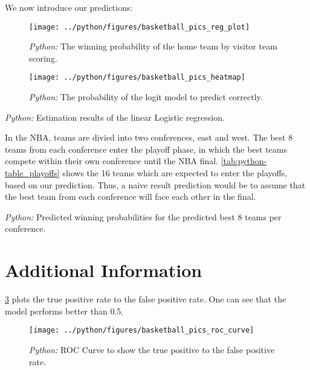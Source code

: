 \documentclass[11pt, a4paper, leqno]{article}
\begin{document}
We now introduce our predictions:


\begin{figure}[H]
\centering
\caption{\emph{Python:} The winning probability of the home team by visitor team scoring.}
\texttt{[image: ../python/figures/basketball\_pics\_reg\_plot]}
    \label{fig:python-reg_plot}

\end{figure}

\begin{figure}[H]

    \centering
    \caption{\emph{Python:} The probability of the logit model to predict correctly.}
    \texttt{[image: ../python/figures/basketball\_pics\_heatmap]}
    \label{fig:python-heatmap}

\end{figure}

\begin{table}[H]
    \caption{\label{tab:python-inference_model}\emph{Python:} Estimation results of the
    linear Logistic regression.}
    
\end{table}

In the NBA, teams are divied into two conferences, east and west. The best 8 teams from each conference enter the playoff phase, in which the best teams compete within their own conference until the NBA final.
\ref{tab:python-table_playoffs} shows the 16 teams which are expected to enter the playoffs, based on our prediction. Thus, a naive result prediction would be to assume that the best team from each conference will face each other in the final.

\begin{table}[H]
    \caption{\label{tab:python-table_playoffs}\emph{Python:} Predicted winning probabilities for the predicted best 8 teams per conference.}
    
\end{table}




\section{Additional Information}

\ref{fig:python-roc_curve} plots the true positive rate to the false positive rate. One can see that the model performs better than 0.5.

\begin{figure}[H]
   \centering
    \caption{\emph{Python:} ROC Curve to show the true positive to the false positive rate.}
    \texttt{[image: ../python/figures/basketball\_pics\_roc\_curve]}
    \label{fig:python-roc_curve}

\end{figure}
\end{document}
